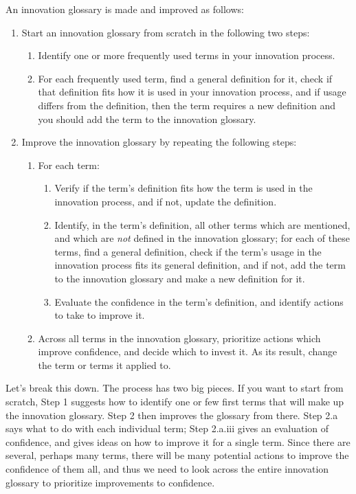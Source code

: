 An innovation glossary is made and improved as follows:
\begin{enumerate}
    \item Start an innovation glossary from scratch in the following two steps:
        \begin{enumerate}
                \item Identify one or more frequently used terms in your innovation process.
                \item For each frequently used term, find a general definition for it, check if that definition fits how it is used in your innovation process, and if usage differs from the definition, then the term requires a new definition and you should add the term to the innovation glossary.
        \end{enumerate}
    \item Improve the innovation glossary by repeating the following steps: 
        \begin{enumerate}
            \item For each term:
                \begin{enumerate} 
                    \item Verify if the term's definition fits how the term is used in the innovation process, and if not, update the definition.
                    \item Identify, in the term's definition, all other terms which are mentioned, and which are \textit{not} defined in the innovation glossary; for each of these terms, find a general definition, check if the term's usage in the innovation process fits its general definition, and if not, add the term to the innovation glossary and make a new definition for it.
                    \item Evaluate the confidence in the term's definition, and identify actions to take to improve it.
                \end{enumerate}
            \item Across all terms in the innovation glossary, prioritize actions which improve confidence, and decide which to invest it. As its result, change the term or terms it applied to.
        \end{enumerate}
\end{enumerate}

Let's break this down. The process has two big pieces. If you want to start from scratch, Step 1 suggests how to identify one or few first terms that will make up the innovation glossary. Step 2 then improves the glossary from there. Step 2.a says what to do with each individual term; Step 2.a.iii gives an evaluation of confidence, and gives ideas on how to improve it for a single term. Since there are several, perhaps many terms, there will be many potential actions to improve the confidence of them all, and thus we need to look across the entire innovation glossary to prioritize improvements to confidence.





\printbibliography